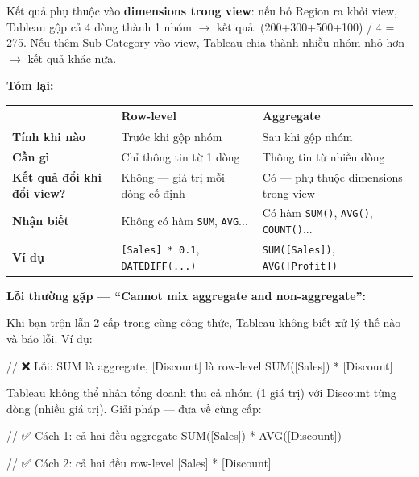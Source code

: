 \documentclass[12pt]{article}
\begin{document}
\noindent Kết quả phụ thuộc vào \textbf{dimensions trong view}: nếu bỏ Region ra khỏi view, Tableau gộp cả 4 dòng thành 1 nhóm $\rightarrow$ kết quả: (200+300+500+100) / 4 = 275. Nếu thêm Sub-Category vào view, Tableau chia thành nhiều nhóm nhỏ hơn $\rightarrow$ kết quả khác nữa.

\noindent \textbf{Tóm lại:}

\begin{center}
\renewcommand{\arraystretch}{1.4}
\begin{tabularx}{\linewidth}{l X X}
\toprule
 & \textbf{Row-level} & \textbf{Aggregate} \\
\midrule
\textbf{Tính khi nào} & Trước khi gộp nhóm & Sau khi gộp nhóm \\
\textbf{Cần gì} & Chỉ thông tin từ 1 dòng & Thông tin từ nhiều dòng \\
\textbf{Kết quả đổi khi đổi view?} & Không --- giá trị mỗi dòng cố định & Có --- phụ thuộc dimensions trong view \\
\textbf{Nhận biết} & Không có hàm \texttt{SUM}, \texttt{AVG}... & Có hàm \texttt{SUM()}, \texttt{AVG()}, \texttt{COUNT()}... \\
\textbf{Ví dụ} & \texttt{[Sales] * 0.1}, \texttt{DATEDIFF(...)} & \texttt{SUM([Sales])}, \texttt{AVG([Profit])} \\
\bottomrule
\end{tabularx}
\end{center}

\noindent \textbf{Lỗi thường gặp --- ``Cannot mix aggregate and non-aggregate'':}

\noindent Khi bạn trộn lẫn 2 cấp trong cùng công thức, Tableau không biết xử lý thế nào và báo lỗi. Ví dụ:

\begin{aivncodebox}[]
\begin{python}
// ❌ Lỗi: SUM là aggregate, [Discount] là row-level
SUM([Sales]) * [Discount]
\end{python}
\end{aivncodebox}

\noindent Tableau không thể nhân tổng doanh thu cả nhóm (1 giá trị) với Discount từng dòng (nhiều giá trị). Giải pháp --- đưa về cùng cấp:

\begin{aivncodebox}[]
\begin{python}
// ✅ Cách 1: cả hai đều aggregate
SUM([Sales]) * AVG([Discount])

// ✅ Cách 2: cả hai đều row-level
[Sales] * [Discount]
\end{python}
\end{aivncodebox}
\end{document}
